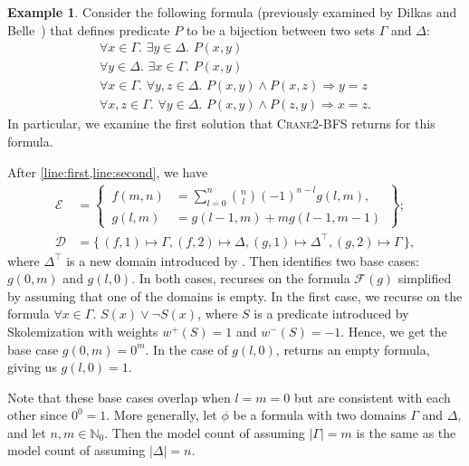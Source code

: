 \documentclass{article}
\theoremstyle{definition}
\newtheorem{example}{Example}
\newcommand{\Cranebfs}{\textsc{Crane2-BFS}}
\begin{document}
\begin{example}\label{example:overall}
  Consider the following formula (previously examined by Dilkas and
  Belle~) that defines predicate $P$ to be a
  bijection between two sets $\Gamma$ and $\Delta$:
  \[
    \begin{gathered}
      \forall x \in \Gamma\text{. }\exists y \in \Delta\text{. }P(x, y)\\
      \forall y \in \Delta\text{. }\exists x \in \Gamma\text{. }P(x, y)\\
      \forall x \in \Gamma\text{. }\forall y, z \in \Delta\text{. }P(x, y) \land P(x, z) \Rightarrow y = z\\
      \forall x, z \in \Gamma\text{. }\forall y \in \Delta\text{. }P(x, y) \land P(z, y) \Rightarrow x = z.
    \end{gathered}
  \]
  In particular, we examine the first solution that \Cranebfs{} returns for this
  formula.

  After \cref{line:first,line:second}, we have
  \begin{align*}
    \mathcal{E} &= \left\{\,\begin{aligned}f(m, n) &= \sum_{l=0}^{n} \binom{n}{l}{(-1)}^{n-l}g(l, m),\\ g(l, m) &= g(l-1, m) + mg(l-1, m-1)\end{aligned}\,\right\};\\
    \mathcal{D} &= \{\, (f, 1) \mapsto \Gamma, (f, 2) \mapsto \Delta, (g, 1) \mapsto \Delta^{\top}, (g, 2) \mapsto \Gamma \,\},
  \end{align*}
  where $\Delta^{\top}$ is a new domain introduced by \Crane. Then
  \FindBaseCases identifies two base cases: $g(0, m)$ and $g(l, 0)$. In both
  cases, \CompileWithBaseCases recurses on the formula $\mathcal{F}(g)$
  simplified by assuming that one of the domains is empty. In the first case, we
  recurse on the formula $\forall x \in \Gamma\text{. }S(x) \lor \neg S(x)$,
  where $S$ is a predicate introduced by Skolemization with weights
  $w^{+}(S) = 1$ and $w^{-}(S) = -1$. Hence, we get the base case
  $g(0, m) = 0^{m}$. In the case of $g(l, 0)$, 
  returns an empty formula, giving us $g(l, 0) = 1$.
\end{example}

Note that these base cases overlap when $l = m = 0$ but are consistent with each
other since $0^{0} = 1$. More generally, let $\phi$ be a formula with two
domains $\Gamma$ and $\Delta$, and let $n, m \in \mathbb{N}_{0}$. Then the model
count of  assuming $|\Gamma| = m$ is the same
as the model count of  assuming $|\Delta| = n$.
\end{document}
